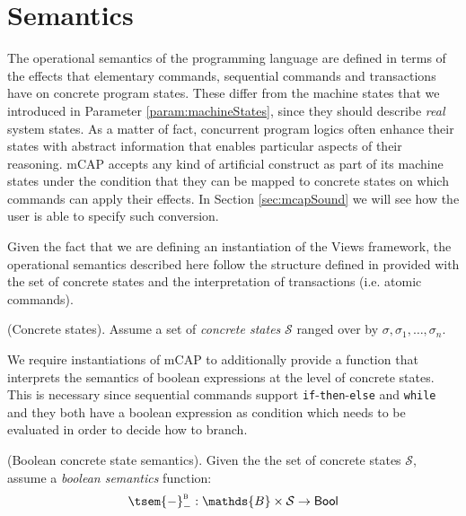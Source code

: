 \section{Semantics}
\label{sec:mcapOpSem}
The operational semantics of the programming language are defined in terms of the effects that elementary commands, sequential commands and transactions have on concrete program states. These differ from the machine states that we introduced in Parameter \ref{param:machineStates}, since they should describe \textit{real} system states. As a matter of fact, concurrent program logics often enhance their states with abstract information that enables particular aspects of their reasoning. mCAP accepts any kind of artificial construct as part of its machine states under the condition that they can be mapped to concrete states on which commands can apply their effects. In Section \ref{sec:mcapSound} we will see how the user is able to specify such conversion.

Given the fact that we are defining an instantiation of the Views framework, the operational semantics described here follow the structure defined in \cite{views} provided with the set of concrete states and the interpretation of transactions (i.e. atomic commands).

\begin{param}
	(Concrete states).
	Assume a set of \emph{concrete states} $\mathcal{S}$ ranged over by $\sigma, \sigma_1, \ldots, \sigma_n$.
\end{param}

We require instantiations of mCAP to additionally provide a function that interprets the semantics of boolean expressions at the level of concrete states. This is necessary since sequential commands support \texttt{if}-\texttt{then}-\texttt{else} and \texttt{while} and they both have a boolean expression as condition which needs to be evaluated in order to decide how to branch.
\begin{param}
	\label{param:boolConcrete}
	(Boolean concrete state semantics).
	Given the the set of concrete states $\mathcal{S}$, assume a \emph{boolean semantics} function:
	\[
		\tsem{-}^\textsc{b}_- : \mathds{B} \times \mathcal{S} \rightarrow \mathsf{Bool}
	\]	
\end{param}

